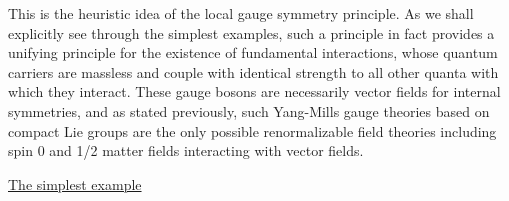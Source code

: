 \documentclass[a4paper,11pt]{article}
\begin{document}
This is the heuristic idea of the local gauge symmetry principle.
As we shall explicitly see through the simplest examples, such a principle
in fact provides a unifying principle for the existence of fundamental
interactions, whose quantum carriers are massless and couple with identical
strength to all other quanta with which they interact. These gauge bosons 
are necessarily vector fields for internal symmetries,
and as stated previously, such Yang-Mills gauge theories based on
compact Lie groups are the only possible re\-nor\-ma\-li\-za\-ble field 
theories including spin 0 and 1/2 matter fields interacting with vector fields.

\vspace{10pt}

\noindent\underline{The simplest example}

\vspace{5pt}
\end{document}
